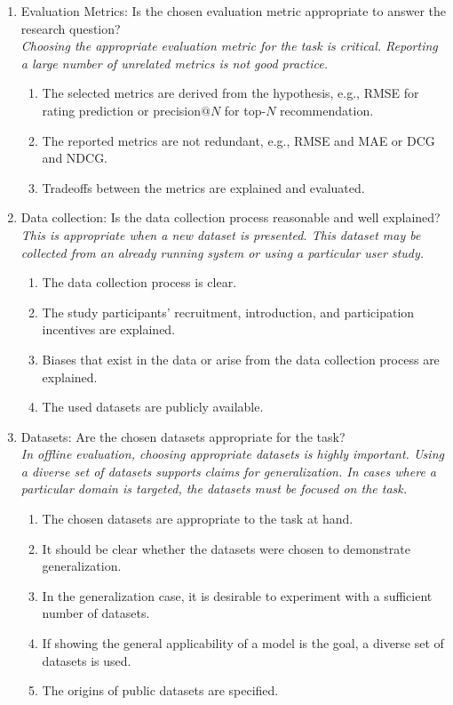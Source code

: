 \documentclass{article}
\begin{document}
\begin{enumerate}
    \item Evaluation Metrics: Is the chosen evaluation metric appropriate to answer the research question? \\
    \emph{Choosing the appropriate evaluation metric for the task is critical. Reporting a large number of unrelated metrics is not good practice.}
    \begin{enumerate}[label*=\arabic*.]
        \item The selected metrics are derived from the hypothesis, e.g., RMSE for rating prediction or precision$@N$ for top-$N$ recommendation. 
        \item The reported metrics are not redundant, e.g., RMSE and MAE or DCG and NDCG.
        \item Tradeoffs between the metrics are explained and evaluated.
    \end{enumerate}

    \item Data collection:
    Is the data collection process reasonable and well explained?\\ 
    \emph{This is appropriate when a new dataset is presented. This dataset may be collected from an already running system or using a particular user study.}
    \begin{enumerate} [label*=\arabic*.]
       \item The data collection process is clear.
        \item The study participants' recruitment, introduction, and participation incentives are explained.
        \item Biases that exist in the data or arise from the data collection process are explained.
        \item The used datasets are publicly available.
    \end{enumerate}

    \item Datasets: Are the chosen datasets appropriate for the task? \\
    \emph{In offline evaluation, choosing appropriate datasets is highly important. Using a diverse set of datasets supports claims for generalization. In cases where a particular domain is targeted, the datasets must be focused on the task.}
    \begin{enumerate} [label*=\arabic*.]
        \item The chosen datasets are appropriate to the task at hand.
        \item It should be clear whether the datasets were chosen to demonstrate generalization.
        \item In the generalization case, it is desirable to experiment with a sufficient number of datasets. %
        \item If showing the general applicability of a model is the goal, a diverse set of datasets is used.
        \item The origins of public datasets are specified.
    \end{enumerate}


\end{enumerate}
\end{document}
